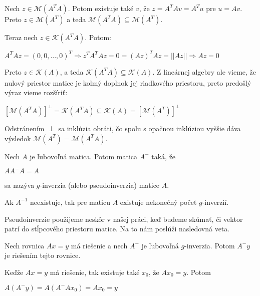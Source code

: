 \begin{dokaz}
Nech $z \in \mathcal{M}(A^T A)$. Potom existuje také $v$, že $z = A^T A v = A^T u$ pre $u = A v$.
Preto $z \in \mathcal{M}(A^T)$ a teda $\mathcal{M}(A^T A) \subseteq \mathcal{M}(A^T)$.

Teraz nech $z \in \mathcal{K}(A^T A)$. Potom:

\begin{center}
$
A^T A z = (0, 0, \ldots, 0)^T \Rightarrow z^T A^T A z = 0 = (Az)^T Az = ||Az|| \Rightarrow Az = 0
$
\end{center}

Preto $z \in \mathcal{K}(A)$, a teda $\mathcal{K}(A^T A) \subseteq \mathcal{K}(A)$.
Z lineárnej algebry ale vieme, že nulový priestor matice je kolmý doplnok jej riadkového priestoru,
preto predošlý výraz vieme rozšíriť:
\begin{center}
$
[\mathcal{M}(A^T A)]^{\perp} = \mathcal{K}(A^T A) \subseteq \mathcal{K}(A) = [\mathcal{M}(A^T)]^{\perp}
$
\end{center}

Odstránením $\perp$ sa inklúzia obráti, čo spolu s opačnou inklúziou vyššie dáva výsledok $\mathcal{M}(A^T) = \mathcal{M}(A^T A)$.
\end{dokaz}

\begin{defin}
Nech $A$ je ľubovoľná matica. Potom matica $A^-$ taká, že
\begin{center}
$A A^- A = A$
\end{center}
sa nazýva $g$-inverzia (alebo pseudoinverzia) matice $A$.
\end{defin}

\begin{com}
Ak $A^{-1}$ neexistuje, tak pre maticu $A$ existuje nekonečný počet $g$-inverzií.
\end{com}

Pseudoinverzie použijeme neskôr v našej práci, keď budeme skúmať, 
či vektor patrí do stĺpcového priestoru matice. Na to nám poslúži nasledovná veta.

\begin{theorem}
\label{veta3}
Nech rovnica $Ax = y$ má riešenie a nech $A^-$ je ľubovoľná $g$-inverzia. Potom $A^- y$ je riešením tejto rovnice.
\end{theorem}

\begin{dokaz}
Keďže $Ax = y$ má riešenie, tak existuje také $x_0$, že $A x_0 = y$. Potom 
\begin{center}
$A (A^- y) = A(A^- A x_0) = A x_0 = y$
\end{center}
\end{dokaz}

